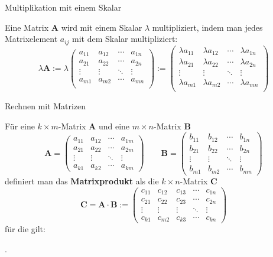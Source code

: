 \begin{frame}{Multiplikation mit einem Skalar}
	\begin{bemerkung}
		Eine Matrix $\pmb{A}$ wird mit einem Skalar $\lambda$ multipliziert, indem man jedes Matrixelement $a_{ij}$ mit dem Skalar multipliziert:
		\[
		\lambda \pmb{A} := \lambda \begin{pmatrix}
			a_{11} & a_{12} & \cdots & a_{1n} \\
			a_{21} & a_{22} & \cdots & a_{2n} \\
			\vdots & \vdots & \ddots & \vdots \\
 			a_{m1} & a_{m2} & \cdots & a_{mn} \\
		\end{pmatrix} := \begin{pmatrix}
		\lambda a_{11} & \lambda a_{12} & \cdots & \lambda a_{1n} \\
		\lambda a_{21} & \lambda a_{22} & \cdots & \lambda a_{2n} \\
		\vdots & \vdots & \ddots & \vdots \\
		\lambda a_{m1} & \lambda a_{m2} & \cdots & \lambda a_{mn} \\
		\end{pmatrix}
		\]
	\end{bemerkung}
\end{frame}

\begin{frame}{Rechnen mit Matrizen}
	\begin{definition}
		Für eine $k \times m$-Matrix $\pmb{A}$ und eine $m \times n$-Matrix $\pmb{B}$
		\[
		\pmb{A} = \begin{pmatrix}
		a_{11} & a_{12}  & \cdots & a_{1m} \\
		a_{21} & a_{22}  & \cdots & a_{2m} \\
		\vdots & \vdots   & \ddots & \vdots \\
		a_{k1} & a_{k2}  & \cdots & a_{km}
		\end{pmatrix} \qquad \pmb{B} = \begin{pmatrix}
		b_{11} & b_{12}  & \cdots & b_{1n} \\
		b_{21} & b_{22}  & \cdots & b_{2n} \\
		\vdots & \vdots   & \ddots & \vdots \\
		b_{m1} & b_{m2}  & \cdots & b_{mn}
		\end{pmatrix}
		\] definiert man das \textbf{Matrixprodukt} als die $k \times n$-Matrix $\pmb{C}$
		\[
		\pmb{C} = \pmb{A} \cdot \pmb{B} := \begin{pmatrix}
		c_{11} & c_{12} & c_{13} & \cdots & c_{1n} \\
		c_{21} & c_{22} & c_{23} & \cdots & c_{2n} \\
		\vdots & \vdots & \vdots  & \ddots & \vdots \\
		c_{k1} & c_{m2} & c_{k3} & \cdots & c_{kn}
		\end{pmatrix}
		\]
		für die gilt:
		
		.
	\end{definition}
\end{frame}

